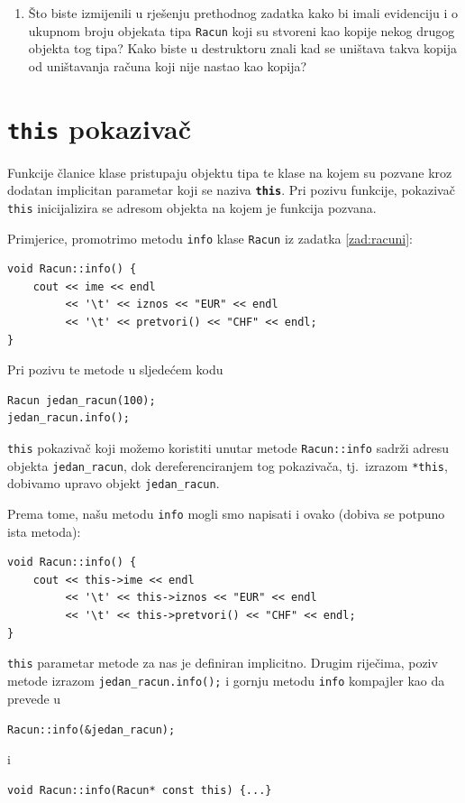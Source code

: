 \begin{razmisljanje}
    \begin{enumerate}
        \item
        Što biste izmijenili u rješenju prethodnog zadatka
        kako bi imali evidenciju i o ukupnom broju
        objekata tipa \texttt{Racun}
        koji su stvoreni kao kopije nekog drugog objekta
        tog tipa?
        Kako biste u destruktoru znali kad se uništava 
        takva kopija od uništavanja računa koji nije nastao kao kopija?
    \end{enumerate}
\end{razmisljanje}


\section{\texttt{this} pokazivač}

Funkcije članice klase pristupaju objektu tipa te klase
na kojem su pozvane kroz dodatan implicitan parametar koji se naziva \texttt{\textbf{this}}.
Pri pozivu funkcije, pokazivač \texttt{this} inicijalizira se
adresom objekta na kojem je funkcija pozvana.
\medskip

Primjerice, promotrimo metodu \texttt{info} klase \texttt{Racun} iz zadatka \ref{zad:racuni}:
\begin{verbatim}
void Racun::info() {
    cout << ime << endl
         << '\t' << iznos << "EUR" << endl
         << '\t' << pretvori() << "CHF" << endl;
}
\end{verbatim}
Pri pozivu te metode u sljedećem kodu
\begin{verbatim}
Racun jedan_racun(100);
jedan_racun.info();
\end{verbatim}
\texttt{this} pokazivač koji možemo koristiti unutar
metode \texttt{Racun::info} sadrži adresu objekta \texttt{jedan\_racun},
dok dereferenciranjem tog pokazivača,
tj.\ izrazom \texttt{*this},
dobivamo upravo objekt \texttt{jedan\_racun}.

Prema tome, našu metodu \texttt{info} mogli smo napisati i ovako
(dobiva se potpuno ista metoda):
\begin{verbatim}
void Racun::info() {
    cout << this->ime << endl
         << '\t' << this->iznos << "EUR" << endl
         << '\t' << this->pretvori() << "CHF" << endl;
}
\end{verbatim}

\texttt{this} parametar metode za nas je definiran implicitno.
Drugim riječima,
poziv metode izrazom 
\texttt{jedan\_racun.info();} i gornju metodu \texttt{info} kompajler kao da prevede u
\begin{center}
    \texttt{Racun::info(\&jedan\_racun);}
\end{center}
i
\begin{center}
    \texttt{void Racun::info(Racun* const this) \{...\}}
\end{center}




